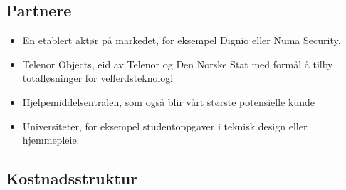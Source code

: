 \subsection{Partnere}




\begin{itemize}
  \item En etablert aktør på markedet, for eksempel Dignio eller Numa Security.
  \item Telenor Objects, eid av Telenor og Den Norske Stat med formål å tilby
    totalløsninger for velferdsteknologi
  \item Hjelpemiddelsentralen, som også blir vårt største potensielle kunde
  \item Universiteter, for eksempel studentoppgaver i teknisk design eller
    hjemmepleie.
\end{itemize}

\subsection{Kostnadsstruktur}



